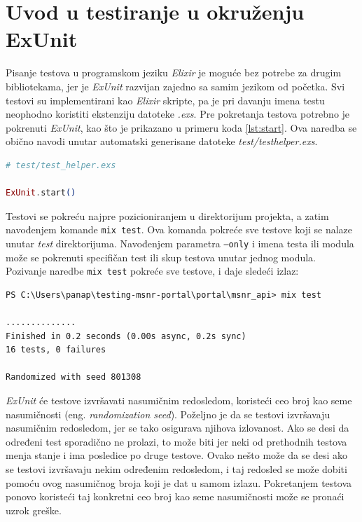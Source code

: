 \documentclass[12pt,oneside]{memoir}
\begin{document}
\section{Uvod u testiranje u okruženju ExUnit}
\label{sec:elixunit}

\par Pisanje testova u programskom jeziku \emph{Elixir} je moguće bez potrebe za drugim bibliotekama, jer je \emph{ExUnit} razvijan zajedno sa samim jezikom od početka. Svi testovi su implementirani kao \emph{Elixir} skripte, pa je pri davanju imena testu neophodno koristiti ekstenziju datoteke \emph{.exs}. Pre pokretanja testova potrebno je pokrenuti \emph{ExUnit}, kao što je prikazano u primeru koda \ref{lst:start}. Ova naredba se obično navodi unutar automatski generisane datoteke \emph{test/test{\textunderscore}helper.exs}.  \\

\begin{minipage}{\linewidth}
\begin{lstlisting}[language=elixir, basicstyle=\small, caption={Pokretanje ExUnit},captionpos=b, label={lst:start}]
# test/test_helper.exs

ExUnit.start()
\end{lstlisting}
\end{minipage}

\par Testovi se pokreću najpre pozicioniranjem u direktorijum projekta, a zatim navođenjem komande \texttt{mix test}. Ova komanda pokreće sve testove koji se nalaze unutar \emph{test} direktorijuma. Navođenjem parametra \texttt{---only} i imena testa ili modula može se pokrenuti specifičan test ili skup testova unutar jednog modula. Pozivanje naredbe \texttt{mix test} pokreće sve testove, i daje sledeći izlaz:  

\begin{minipage}{\linewidth}
\begin{lstlisting}[style=DOS]
PS C:\Users\panap\testing-msnr-portal\portal\msnr_api> mix test

..............
Finished in 0.2 seconds (0.00s async, 0.2s sync)
16 tests, 0 failures

Randomized with seed 801308
\end{lstlisting}
\end{minipage}

\par \emph{ExUnit} će testove izvršavati nasumičnim redosledom, koristeći ceo broj kao seme nasumičnosti (eng. \emph{randomization seed}). Poželjno je da se testovi izvršavaju nasumičnim redosledom, jer se tako osigurava njihova izlovanost. Ako se desi da određeni test sporadično ne prolazi, to može biti jer neki od prethodnih testova menja stanje i ima posledice po druge testove. Ovako nešto može da se desi ako se testovi izvršavaju nekim određenim redosledom, i taj redosled se može dobiti pomoću ovog nasumičnog broja koji je dat u samom izlazu. Pokretanjem testova ponovo koristeći taj konkretni ceo broj kao seme nasumičnosti može se pronaći uzrok greške. 
\end{document}
